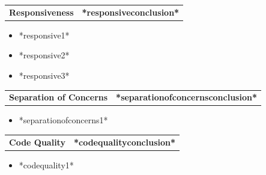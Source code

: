 \documentclass{scrartcl}
\begin{document}
\begin{table}[H] 
	\begin{tabular}{l c}
		\Large{\textbf{Responsiveness} } & \textcolor{cerulean}{\textbf{*responsiveconclusion*}} \\
	\end{tabular}
\end{table}


\begin{itemize}
	 \item *responsive1*

	 
	\item *responsive2*

	 
	\item *responsive3*

	
\end{itemize}
	

\begin{table} [H]
	\begin{tabular}{l c}
		\Large{\textbf{Separation of Concerns} } & \textcolor{cerulean}{\textbf{*separationofconcernsconclusion*}} \\
	\end{tabular}
\end{table}

\begin{itemize}
	 \item *separationofconcerns1*

	 
\end{itemize}
	

\begin{table} [H]
	\begin{tabular}{l c}
		\Large{\textbf{Code Quality} } & \textcolor{cerulean}{\textbf{*codequalityconclusion*}} \\
	\end{tabular}
\end{table}

\begin{itemize}
	 \item *codequality1*

	 
\end{itemize}

\section*{\center{{\small\color{mygray}{PROJECT EVALUATION}} \\ \vspace{0.5 cm} \Large{\color{cerulean}{*projectconclusion*}}}\vspace{0.4 cm}}
\end{document}
